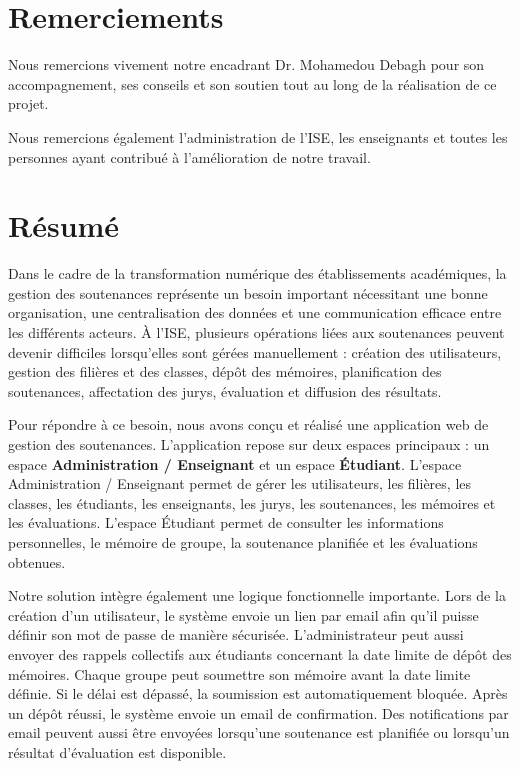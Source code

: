 \documentclass[a4paper,12pt,oneside]{report}
\begin{document}
\chapter*{Remerciements}

Nous remercions vivement notre encadrant Dr. Mohamedou Debagh pour son accompagnement, ses conseils et son soutien tout au long de la réalisation de ce projet.

Nous remercions également l'administration de l'ISE, les enseignants et toutes les personnes ayant contribué à l'amélioration de notre travail.

\clearpage

\chapter*{Résumé}

Dans le cadre de la transformation numérique des établissements académiques, la gestion des soutenances représente un besoin important nécessitant une bonne organisation, une centralisation des données et une communication efficace entre les différents acteurs. À l'ISE, plusieurs opérations liées aux soutenances peuvent devenir difficiles lorsqu'elles sont gérées manuellement : création des utilisateurs, gestion des filières et des classes, dépôt des mémoires, planification des soutenances, affectation des jurys, évaluation et diffusion des résultats.

Pour répondre à ce besoin, nous avons conçu et réalisé une application web de gestion des soutenances. L'application repose sur deux espaces principaux : un espace \textbf{Administration / Enseignant} et un espace \textbf{Étudiant}. L'espace Administration / Enseignant permet de gérer les utilisateurs, les filières, les classes, les étudiants, les enseignants, les jurys, les soutenances, les mémoires et les évaluations. L'espace Étudiant permet de consulter les informations personnelles, le mémoire de groupe, la soutenance planifiée et les évaluations obtenues.

Notre solution intègre également une logique fonctionnelle importante. Lors de la création d'un utilisateur, le système envoie un lien par email afin qu'il puisse définir son mot de passe de manière sécurisée. L'administrateur peut aussi envoyer des rappels collectifs aux étudiants concernant la date limite de dépôt des mémoires. Chaque groupe peut soumettre son mémoire avant la date limite définie. Si le délai est dépassé, la soumission est automatiquement bloquée. Après un dépôt réussi, le système envoie un email de confirmation. Des notifications par email peuvent aussi être envoyées lorsqu'une soutenance est planifiée ou lorsqu'un résultat d'évaluation est disponible.
\end{document}
